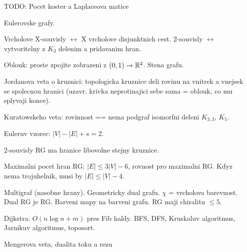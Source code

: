 TODO: Pocet koster a Laplaceova matice

Eulerovske grafy.

Vrcholove X-souvisly $\leftrightarrow$ X vrcholove disjunktnich cest.
2-souvisly $\leftrightarrow$ vytvoritelny z $K_3$ delenim a pridavanim hran.

Oblouk: proste zpojite zobrazeni z $(0,1)\rightarrow\mathbb{R}^2$.
Stena grafu.

Jordanova veta o kruznici: topologicka kruznice deli rovinu na vnitrek a vnejsek
se spolecnou hranici (uzavr. krivka neprotinajici sebe sama = oblouk, co mu
splyvaji konce).

Kuratowskeho veta: rovinnost == nema podgraf isomorfni deleni $K_{3,3}$, $K_5$.

Euleruv vzorec: $|V|-|E|+s=2$.

2-souvisly RG ma hranice libovolne stejny kruznice.

Maximalni pocet hran RG: $|E|\leq 3|V|-6$, rovnost pro maximalni RG.
Kdyz nema trojuhelnik, musi by $|E|\leq |V|-4$.

Multigraf (nasobne hrany).
Geometricky dual grafu.
$\chi$ = vrcholova barevnost.
Dual RG je RG.
Barveni mapy na barveni grafu.
RG maji chiralitu $\leq 5$.

Dijkstra: $O(n\log n+m)$ pres Fib haldy.
BFS, DFS, Kruskaluv algoritmus, Jarnikuv algoritmus, toposort.

Mengerova veta, dualita toku a rezu
